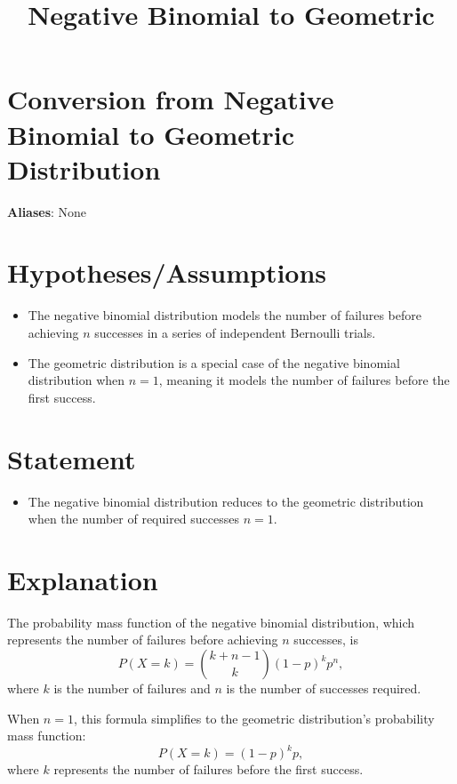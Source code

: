 \documentclass{article}
\title{Negative Binomial to Geometric}
\author{}
\date{}
\begin{document}
\maketitle

\section*{Conversion from Negative Binomial to Geometric Distribution}
\textbf{Aliases}: None

\section*{Hypotheses/Assumptions}
\begin{itemize}
    \item The negative binomial distribution models the number of failures before achieving \( n \) successes in a series of independent Bernoulli trials.
    \item The geometric distribution is a special case of the negative binomial distribution when \( n = 1 \), meaning it models the number of failures before the first success.
\end{itemize}

\section*{Statement}
\begin{itemize}
    \item The negative binomial distribution reduces to the geometric distribution when the number of required successes \( n = 1 \).
\end{itemize}

\section*{Explanation}
The probability mass function of the negative binomial distribution, which represents the number of failures before achieving \( n \) successes, is
\[
P(X = k) = \binom{k + n - 1}{k} (1 - p)^k p^n,
\]
where \( k \) is the number of failures and \( n \) is the number of successes required.

When \( n = 1 \), this formula simplifies to the geometric distribution's probability mass function:
\[
P(X = k) = (1 - p)^k p,
\]
where \( k \) represents the number of failures before the first success.
\end{document}
